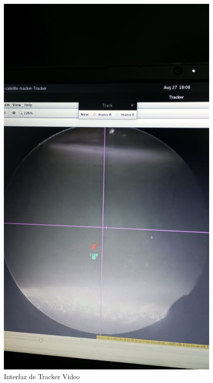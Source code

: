 \begin{figure}[H]
    \centering
    \includegraphics[width=0.35\linewidth]{./images/Interfaz-Tracker.jpeg}
    \caption{Interfaz de Tracker Video}
    \label{fig:Tracker}
\end{figure}
